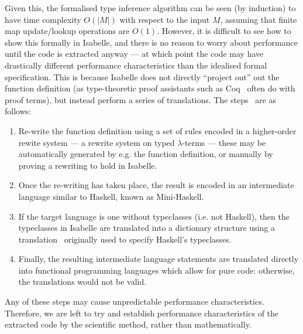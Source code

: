 Given this, the formalised type inference algorithm can be seen (by induction) to have time complexity \(O(|M|)\) with respect to the input \(M\), assuming that finite map update/lookup operations are \(O(1)\).
However, it is difficult to see how to show this formally in Isabelle, and there is no reason to worry about performance until the code is extracted anyway --- at which point the code may have drastically different performance characteristics than the idealised formal specification.
This is because Isabelle does not directly ``project out'' out the function definition (as type-theoretic proof assistants such as Coq~\cite{coq-extract} often do with proof terms), but instead perform a series of translations.
The steps~\cite{HRS} are as follows:
\begin{enumerate}
\item
Re-write the function definition using a set of rules encoded in a higher-order rewite system --- a rewrite system on typed \(\lambda\)-terms --- these may be automatically generated by e.g. the function definition, or manually by proving a rewriting to hold in Isabelle.
\item
Once the re-writing has taken place, the result is encoded in an intermediate language similar to Haskell, known as Mini-Haskell.
\item
If the target language is one without typeclasses (i.e. not Haskell), then the typeclasses in Isabelle are translated into a dictionary structure using a translation~\cite{dictionary-translation} originally used to specify Haskell's typeclasses.
\item
Finally, the resulting intermediate language statements are translated directly into functional programming languages which allow for pure code: otherwise, the translations would not be valid.
\end{enumerate}

Any of these steps may cause unpredictable performance characteristics.
Therefore, we are left to try and establish performance characteristics of the extracted code by the scientific method, rather than mathematically.

